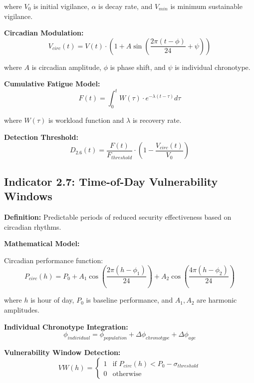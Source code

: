 \documentclass[11pt,a4paper]{article}
\begin{document}
where $V_0$ is initial vigilance, $\alpha$ is decay rate, and $V_{min}$ is minimum sustainable vigilance.

\textbf{Circadian Modulation:}
\begin{equation}
V_{circ}(t) = V(t) \cdot (1 + A \sin(\frac{2\pi(t - \phi)}{24} + \psi))
\end{equation}

where $A$ is circadian amplitude, $\phi$ is phase shift, and $\psi$ is individual chronotype.

\textbf{Cumulative Fatigue Model:}
\begin{equation}
F(t) = \int_0^t W(\tau) \cdot e^{-\lambda(t-\tau)} d\tau
\end{equation}

where $W(\tau)$ is workload function and $\lambda$ is recovery rate.

\textbf{Detection Threshold:}
\begin{equation}
D_{2.6}(t) = \frac{F(t)}{F_{threshold}} \cdot \left(1 - \frac{V_{circ}(t)}{V_0}\right)
\end{equation}

\subsection{Indicator 2.7: Time-of-Day Vulnerability Windows}

\textbf{Definition:} Predictable periods of reduced security effectiveness based on circadian rhythms.

\textbf{Mathematical Model:}

Circadian performance function:
\begin{equation}
P_{circ}(h) = P_0 + A_1 \cos\left(\frac{2\pi(h - \phi_1)}{24}\right) + A_2 \cos\left(\frac{4\pi(h - \phi_2)}{24}\right)
\end{equation}

where $h$ is hour of day, $P_0$ is baseline performance, and $A_1, A_2$ are harmonic amplitudes.

\textbf{Individual Chronotype Integration:}
\begin{equation}
\phi_{individual} = \phi_{population} + \Delta\phi_{chronotype} + \Delta\phi_{age}
\end{equation}

\textbf{Vulnerability Window Detection:}
\begin{equation}
VW(h) = \begin{cases}
1 & \text{if } P_{circ}(h) < P_0 - \sigma_{threshold} \\
0 & \text{otherwise}
\end{cases}
\end{equation}
\end{document}
